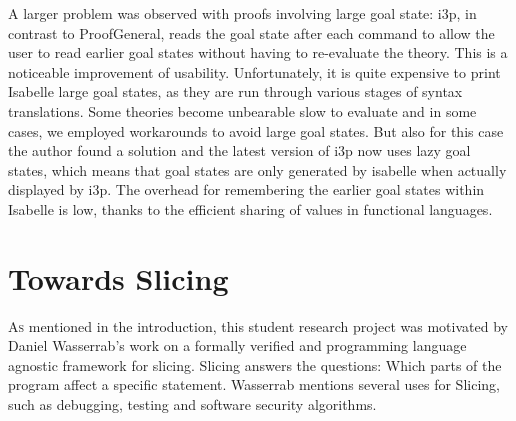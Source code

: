 \documentclass[a4paper,halfparskip,DIV=10,11pt]{scrbook}
\begin{document}
A larger problem was observed with proofs involving large goal state: i3p, in contrast to ProofGeneral, reads the goal state after each command to allow the user to read earlier goal states without having to re-evaluate the theory. This is a noticeable improvement of usability. Unfortunately, it is quite expensive to print Isabelle large goal states, as they are run through various stages of syntax translations. Some theories become unbearable slow to evaluate and in some cases, we employed workarounds to avoid large goal states. But also for this case the author found a solution and the latest version of i3p now uses lazy goal states, which means that goal states are only generated by isabelle when actually displayed by i3p. The overhead for remembering the earlier goal states within Isabelle is low, thanks to the efficient sharing of values in functional languages. 


\chapter{Towards Slicing}
\label{chapslicing}

\lettrine[lines=3]As mentioned in the introduction, this student research project was motivated by Daniel Wasserrab’s work on a formally verified and programming language agnostic framework for slicing. Slicing answers the questions: Which parts of the program affect a specific statement. Wasserrab mentions several uses for Slicing, such as debugging, testing and software security algorithms.
\end{document}
